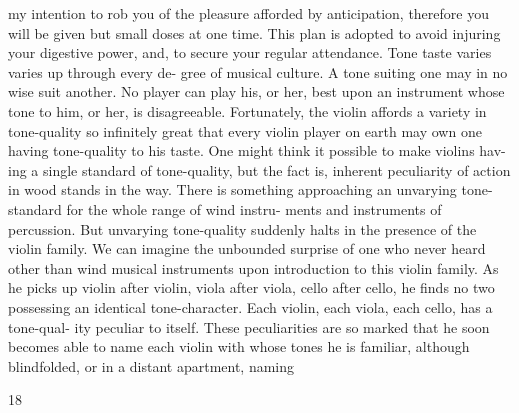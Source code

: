 my intention to rob you of the pleasure afforded by anticipation, therefore you will be given but small doses at one time. This plan is adopted to avoid injuring your digestive power, and, to secure your regular attendance. Tone taste varies varies up through every de- gree of musical culture. A tone suiting one may in no wise suit another. No player can play his, or her, best upon an instrument whose tone to him, or her, is disagreeable. Fortunately, the violin affords a variety in tone-quality so infinitely great that every violin player on earth may own one having tone-quality to his taste. One might think it possible to make violins hav- ing a single standard of tone-quality, but the fact is, inherent peculiarity of action in wood stands in the way. There is something approaching an unvarying tone-standard for the whole range of wind instru- ments and instruments of percussion. But unvarying tone-quality suddenly halts in the presence of the violin family. We can imagine the unbounded surprise of one who never heard other than wind musical instruments upon introduction to this violin family. As he picks up violin after violin, viola after viola, cello after cello, he finds no two possessing an identical tone-character. Each violin, each viola, each cello, has a tone-qual- ity peculiar to itself. These peculiarities are so marked that he soon becomes able to name each violin with whose tones he is familiar, although blindfolded, or in a distant apartment, naming

18

